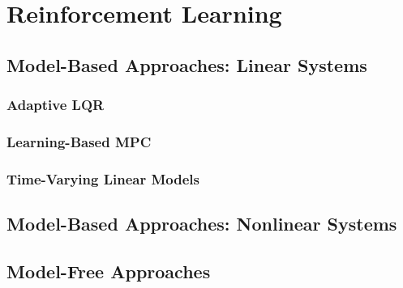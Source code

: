\section{Reinforcement Learning}

\subsection{Model-Based Approaches: Linear Systems}

\subsubsection{Adaptive LQR}



\subsubsection{Learning-Based MPC}


\subsubsection{Time-Varying Linear Models}



\subsection{Model-Based Approaches: Nonlinear Systems}




\subsection{Model-Free Approaches}

